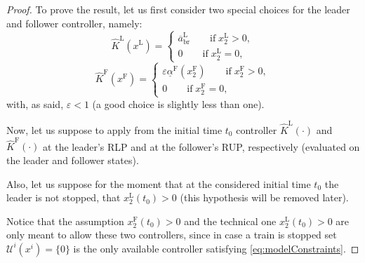 \documentclass[letterpaper, 10 pt, conference]{ieeeconf}
\theoremstyle{definition}
\theoremstyle{nopoint}
\begin{document}
\begin{proof}
	To prove the result, let us first consider two special choices for the leader and follower controller, namely: 
	\begin{equation*}
		\hat{K}^\mathrm{L}(x^\mathrm{L})=\begin{cases}
			\overline{a}^\mathrm{L}_{\mathrm{br}} \qquad \text{if}\; x_2^\mathrm{L}>0,\\
			0 \qquad  \text{if} \; x_2^\mathrm{L}=0,
		\end{cases}
	\end{equation*}
	\begin{equation*}
		\hat{K}^\mathrm{F}(x^\mathrm{F})=\begin{cases}
			\varepsilon \underline{\alpha}^\mathrm{F}(x_2^\mathrm{F})\qquad  \text{if} \; x_2^\mathrm{F}>0,\\
			0\qquad  \text{if} \; x_2^\mathrm{F}=0,
		\end{cases}
	\end{equation*}
	with, as said, $\varepsilon<1$ (a good choice is slightly less than one). 
	
	
	
	
	Now, let us suppose to apply from the initial time $t_0$ controller $\hat{K}^\mathrm{L}(\cdot)$  and  $\hat{K}^\mathrm{F}(\cdot)$ at the leader's RLP and at the follower's RUP, respectively (evaluated on the leader and follower states). 
	
	
	Also, let us suppose for the moment that at the considered initial time $t_0$ the leader is not stopped, that $x_2^\mathrm{L}(t_0)>0$ (this hypothesis will be removed later).
	
	Notice that the assumption $x_2^\mathrm{F}(t_0)>0$  and the technical one $x_2^\mathrm{L}(t_0)>0$ are only meant to allow these two controllers, since in case a train is stopped set $\mathcal{U}^i(x^i)=\{0\}$ is the only available controller satisfying \eqref{eq:modelConstraints}.
	

\end{proof}
\end{document}
